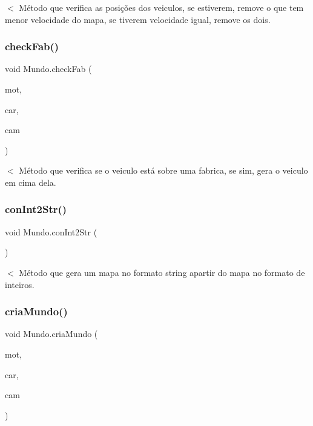 $<$ Método que verifica as posições dos veiculos, se estiverem, remove o que tem menor velocidade do mapa, se tiverem velocidade igual, remove os dois. \mbox{\label{class_mundo_aaf8ab7632e91cf6b92d8beb031858de1}} 
\subsubsection{\texorpdfstring{check\+Fab()}{checkFab()}}
{\footnotesize\ttfamily void Mundo.\+check\+Fab (\begin{DoxyParamCaption}\item[{Array\+List$<$ \mbox{\hyperlink{class_moto}{Moto}} $>$}]{mot,  }\item[{Array\+List$<$ \mbox{\hyperlink{class_carro}{Carro}} $>$}]{car,  }\item[{Array\+List$<$ \mbox{\hyperlink{class_caminhao}{Caminhao}} $>$}]{cam }\end{DoxyParamCaption})}

$<$ Método que verifica se o veiculo está sobre uma fabrica, se sim, gera o veiculo em cima dela. \mbox{\label{class_mundo_a7c0f57fc41e5712a905bc836c9d1f9c5}} 
\subsubsection{\texorpdfstring{con\+Int2\+Str()}{conInt2Str()}}
{\footnotesize\ttfamily void Mundo.\+con\+Int2\+Str (\begin{DoxyParamCaption}{ }\end{DoxyParamCaption})}

$<$ Método que gera um mapa no formato string apartir do mapa no formato de inteiros. \mbox{\label{class_mundo_a89da5526d6fa79801cfa48b587aa8343}} 
\subsubsection{\texorpdfstring{cria\+Mundo()}{criaMundo()}}
{\footnotesize\ttfamily void Mundo.\+cria\+Mundo (\begin{DoxyParamCaption}\item[{Array\+List$<$ \mbox{\hyperlink{class_moto}{Moto}} $>$}]{mot,  }\item[{Array\+List$<$ \mbox{\hyperlink{class_carro}{Carro}} $>$}]{car,  }\item[{Array\+List$<$ \mbox{\hyperlink{class_caminhao}{Caminhao}} $>$}]{cam }\end{DoxyParamCaption})}


